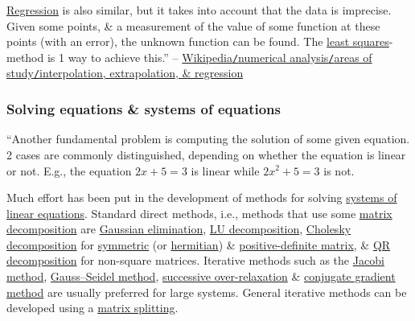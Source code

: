\documentclass[oneside]{book}
\numberwithin{equation}{section}
\begin{document}
\href{https://en.wikipedia.org/wiki/Regression_analysis}{Regression} is also similar, but it takes into account that the data is imprecise. Given some points, \& a measurement of the value of some function at these points (with an error), the unknown function can be found. The \href{https://en.wikipedia.org/wiki/Numerical_methods_for_linear_least_squares}{least squares}-method is 1 way to achieve this.'' -- \href{https://en.wikipedia.org/wiki/Numerical_analysis#Interpolation,_extrapolation,_and_regression}{Wikipedia\texttt{/}numerical analysis\texttt{/}areas of study\texttt{/}interpolation, extrapolation, \& regression}

\subsubsection{Solving equations \& systems of equations}
``Another fundamental problem is computing the solution of some given equation. 2 cases are commonly distinguished, depending on whether the equation is linear or not. E.g., the equation $2x + 5 = 3$ is linear while $2x^2 + 5 = 3$ is not.

Much effort has been put in the development of methods for solving \href{https://en.wikipedia.org/wiki/Systems_of_linear_equations}{systems of linear equations}. Standard direct methods, i.e., methods that use some \href{https://en.wikipedia.org/wiki/Matrix_decomposition}{matrix decomposition} are \href{https://en.wikipedia.org/wiki/Gaussian_elimination}{Gaussian elimination}, \href{https://en.wikipedia.org/wiki/LU_decomposition}{LU decomposition}, \href{https://en.wikipedia.org/wiki/Cholesky_decomposition}{Cholesky decomposition} for \href{https://en.wikipedia.org/wiki/Symmetric_matrix}{symmetric} (or \href{https://en.wikipedia.org/wiki/Hermitian_matrix}{hermitian}) \& \href{https://en.wikipedia.org/wiki/Positive-definite_matrix}{positive-definite matrix}, \& \href{https://en.wikipedia.org/wiki/QR_decomposition}{QR decomposition} for non-square matrices. Iterative methods such as the \href{https://en.wikipedia.org/wiki/Jacobi_method}{Jacobi method}, \href{https://en.wikipedia.org/wiki/Gauss%E2%80%93Seidel_method}{Gauss--Seidel method}, \href{https://en.wikipedia.org/wiki/Successive_over-relaxation}{successive over-relaxation} \& \href{https://en.wikipedia.org/wiki/Conjugate_gradient_method}{conjugate gradient method} are usually preferred for large systems. General iterative methods can be developed using a \href{https://en.wikipedia.org/wiki/Matrix_splitting}{matrix splitting}.
\end{document}
